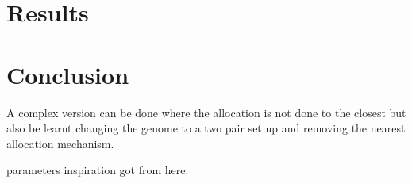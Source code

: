 \documentclass[12pt,oneside,a4paper]{article}
\begin{document}
    \section{Results}


    \section{Conclusion}

    A complex version can be done where the allocation is not done to the closest but also be learnt changing the
    genome to a two pair set up and removing the nearest allocation mechanism. \cite{Capacitated_allo_Zorica}


    parameters inspiration got from here: \cite{Zhou2016/09}


    \newpage
    
    
\end{document}
